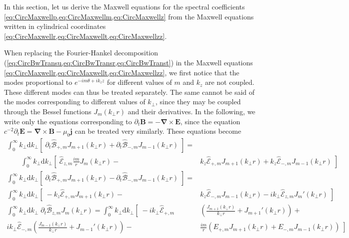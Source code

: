 \documentclass[1p,times]{elsarticle}
\newcommand{\RInteg}[1]{\int_{0}^{\infty} \!\!\!\!\! #1\mathrm{d}#1}
\renewcommand{\vec}[1]{\boldsymbol{#1}}
\newcommand{\spectral}[1]{\hat{\mathcal{#1}}}
\begin{document}
In this section, let us derive the Maxwell equations for the spectral
coefficients \cref{eq:CircMaxwellp,eq:CircMaxwellm,eq:CircMaxwellz}
from the Maxwell equations written in cylindrical coordinates \cref{eq:CircMaxwellr,eq:CircMaxwellt,eq:CircMaxwellzz}.

When replacing the Fourier-Hankel decomposition
(\cref{eq:CircBwTransu,eq:CircBwTransr,eq:CircBwTranst}) in the
Maxwell equations \cref{eq:CircMaxwellr,eq:CircMaxwellt,eq:CircMaxwellzz}, we
first notice that the modes proportional to $e^{-im\theta +ik_z z}$ for different
values of $m$ and $k_z$ are not coupled. These different modes can
thus be treated separately. The same cannot be said of the modes
corresponding to different values of $k_\perp $, since they may be coupled
through the Bessel functions $J_m(k_\perp r)$ and their derivatives. 
In the following, we write only the equations corresponding to $\partial_t \vec{B} =
-\vec{\nabla}\times \vec{E}$, since the equation $c^{-2}\partial_t \vec{E} =
\vec{\nabla}\times\vec{B} - \mu_0 \vec{j}$ can be treated very
similarly. These equations become
\begin{subequations}
\begin{align}
\RInteg{k_\perp } \left[ \; \partial_t \spectral{B}_{+,m}  J_{m+1}(k_\perp r)
  + \partial_t \spectral{B}_{-,m}  J_{m-1}(k_\perp r) \; \right] =&&
\nonumber \\ 
\qquad \RInteg{k_\perp } \left[ \; \spectral{E}_{z,m} \frac{im}{r}
  J_m(k_\perp r) \right.-&\left.
  k_z\spectral{E}_{+,m}J_{m+1}(k_\perp r) + k_z\spectral{E}_{-,m}J_{m-1}(k_\perp r) \;
\right] & \\
\RInteg{k_\perp } \left[ \; \partial_t \spectral{B}_{+,m}  J_{m+1}(k_\perp r)
  - \partial_t \spectral{B}_{-,m}  J_{m-1}(k_\perp r) \; \right] =&&
\nonumber \\
 \RInteg{k_\perp } \left[ \; -k_z\spectral{E}_{+,m}J_{m+1}(k_\perp r)
 \right.-&\left.  k_z\spectral{E}_{-,m}J_{m-1}(k_\perp r) - ik_\perp \spectral{E}_{z,m} J_m'(k_\perp r) \;\right] \\
\RInteg{k_\perp }\; \partial_t \spectral{B}_{z,m}  J_{m}(k_\perp r) =
\RInteg{k_\perp } \left[ \; -ik_\perp
  \spectral{E}_{+,m}\right.&\left(\frac{J_{m+1}(k_\perp r)}{k_\perp r} +
    J_{m+1}'(k_\perp r) \right) + & \nonumber \\
\left. ik_\perp \spectral{E}_{-,m}\left(\frac{J_{m-1}(k_\perp r)}{k_\perp r} +
    J_{m-1}'(k_\perp r) \right) \right.-&\left. \frac{im}{r} \left( E_{+,m} J_{m+1}(k_\perp r) +
    E_{-,m} J_{m-1}(k_\perp r) \right) \;\right] 
\end{align}
\end{subequations}
\end{document}

